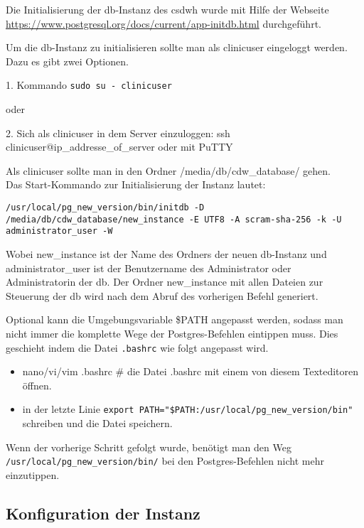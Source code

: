     Die Initialisierung der \ac{db}-Instanz des \ac{csdwh} wurde mit Hilfe der Webseite \url{https://www.postgresql.org/docs/current/app-initdb.html} durchgeführt.
    
    Um die \ac{db}-Instanz zu initialisieren sollte man als clinicuser eingeloggt werden. Dazu es gibt zwei Optionen.
    
    1. Kommando \texttt{sudo su - clinicuser}

    oder 
    
    2. Sich als clinicuser in dem Server einzuloggen: ssh clinicuser@ip\_addresse\_of\_server oder mit PuTTY
      
    Als clinicuser sollte man in den Ordner /media/db/cdw\_database/ gehen.
    \\
    
    Das Start-Kommando zur Initialisierung der Instanz lautet: 
    
    \texttt{/usr/local/pg\_new\_version/bin/initdb -D /media/db/cdw\_database/new\_instance -E UTF8 -A scram-sha-256 -k -U administrator\_user -W}
    
    Wobei new\_instance ist der Name des Ordners der neuen \ac{db}-Instanz und administrator\_user ist der Benutzername des Administrator oder Administratorin der \ac{db}. Der Ordner new\_instance mit allen Dateien zur Steuerung der \ac{db} wird nach dem Abruf des vorherigen Befehl generiert.
    
    Optional kann die Umgebungsvariable \$PATH angepasst werden, sodass man nicht immer die komplette Wege der Postgres-Befehlen eintippen muss. Dies geschieht indem die Datei \texttt{.bashrc} wie folgt angepasst wird.
    
    \begin{itemize}
    	\item nano/vi/vim .bashrc \# die Datei .bashrc mit einem von diesem Texteditoren öffnen.
    	\item in der letzte Linie \texttt{export PATH="\$PATH:/usr/local/pg\_new\_version/bin"} schreiben und die Datei speichern.
    \end{itemize}
  
    Wenn der vorherige Schritt gefolgt wurde, benötigt man den Weg \\ \texttt{/usr/local/pg\_new\_version/bin/} bei den Postgres-Befehlen nicht mehr einzutippen.

	\subsection{Konfiguration der Instanz} 

